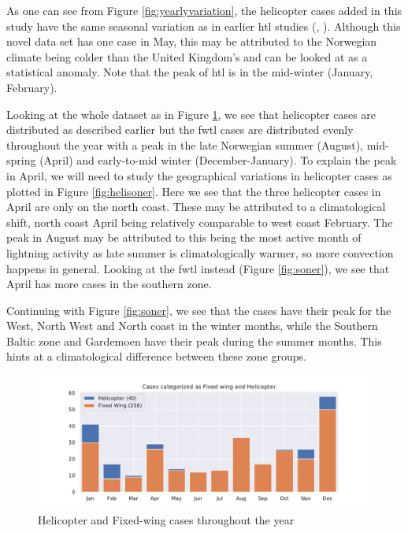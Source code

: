 As one can see from Figure \ref{fig:yearlyvariation}, the helicopter cases added in this study have the same seasonal variation as in earlier \acrshort{htl} studies (\cite{wilkinson2013}, \cite{lande1999}). Although this novel data set has one case in May, this may be attributed to the Norwegian climate being colder than the United Kingdom's and can be looked at as a statistical anomaly. Note that the peak of \acrlong{htl} is in the mid-winter (January, February). 

Looking at the whole dataset as in Figure \ref{fig:helivsfw}, we see that helicopter cases are distributed as described earlier but the \acrshort{fwtl} cases are distributed evenly throughout the year with a peak in the late Norwegian summer (August), mid-spring (April) and early-to-mid winter (December-January). To explain the peak in April, we will need to study the geographical variations  in helicopter cases as plotted in Figure \ref{fig:helisoner}. Here we see that the three helicopter cases in April are only on the north coast. These may be attributed to a climatological shift, north coast April being relatively comparable to west coast February. The peak in August may be attributed to this being the most active month of lightning activity as late summer is climatologically warmer, so more convection happens in general. Looking at the \acrshort{fwtl} instead (Figure \ref{fig:soner}), we see that April has more cases in the southern zone.

Continuing with Figure \ref{fig:soner}, we see that the cases have their peak for the West, North West and North coast in the winter months, while the Southern Baltic zone and Gardemoen have their peak during the summer months. This hints at a climatological difference between these zone groups.

\begin{figure}
    \centering
    \includegraphics[width=\textwidth]{Figures/helivsfw.pdf}
    \caption{Helicopter and Fixed-wing cases throughout the year}
    \label{fig:helivsfw}
\end{figure}


